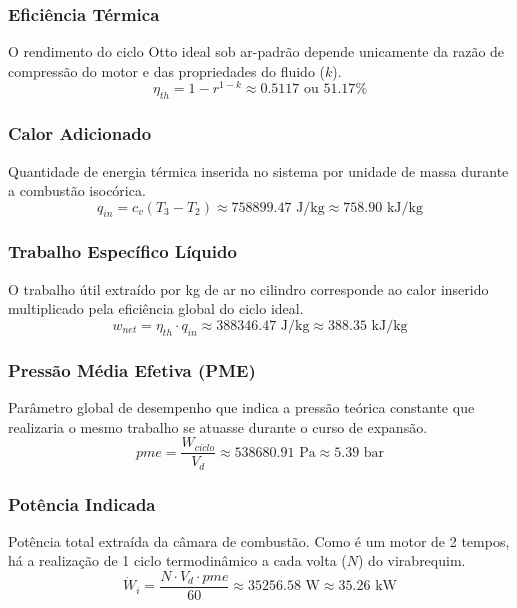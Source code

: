 \subsubsection*{Eficiência Térmica}
\noindent O rendimento do ciclo Otto ideal sob ar-padrão depende unicamente da razão de compressão do motor e das propriedades do fluido ($k$).
\[ \eta_{th} = 1 - r^{1 - k} \approx 0.5117 \text{ ou } 51.17\% \]
\vspace{6pt}

\subsubsection*{Calor Adicionado}
\noindent Quantidade de energia térmica inserida no sistema por unidade de massa durante a combustão isocórica.
\[ q_{in} = c_v (T_{3} - T_{2}) \approx 758899.47 \text{ J/kg} \approx 758.90 \text{ kJ/kg} \]
\vspace{6pt}

\subsubsection*{Trabalho Específico Líquido}
\noindent O trabalho útil extraído por kg de ar no cilindro corresponde ao calor inserido multiplicado pela eficiência global do ciclo ideal.
\[ w_{net} = \eta_{th} \cdot q_{in} \approx 388346.47 \text{ J/kg} \approx 388.35 \text{ kJ/kg} \]
\vspace{6pt}

\subsubsection*{Pressão Média Efetiva (PME)}
\noindent Parâmetro global de desempenho que indica a pressão teórica constante que realizaria o mesmo trabalho se atuasse durante o curso de expansão.
\[ pme = \frac{W_{ciclo}}{V_d} \approx 538680.91 \text{ Pa} \approx 5.39 \text{ bar} \]
\vspace{6pt}

\subsubsection*{Potência Indicada}
\noindent Potência total extraída da câmara de combustão. Como é um motor de 2 tempos, há a realização de 1 ciclo termodinâmico a cada volta ($N$) do virabrequim.
\[ \dot{W}_{i} = \frac{N \cdot V_d \cdot pme}{60} \approx 35256.58 \text{ W} \approx 35.26 \text{ kW} \]
\vspace{6pt}

\newpage